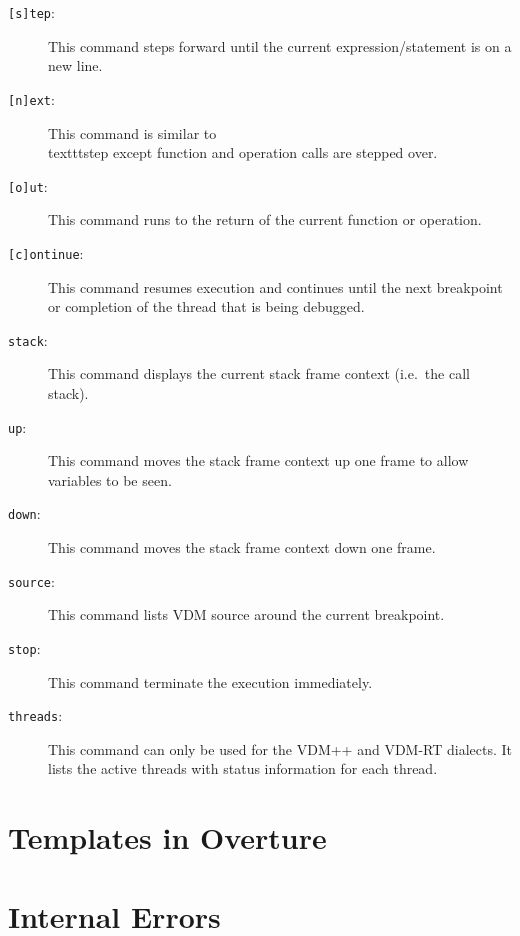 \documentclass{overturerepchap}
\begin{document}
\begin{description}
\item[\texttt{[s]tep}:] This command steps forward until the
  current expression/statement is on a new line. 
\item[\texttt{[n]ext}:] This command is similar to \\texttt{step} except
 function and operation calls are stepped over.  
\item[\texttt{[o]ut}:] This command runs to the return of the current
  function or operation.  
\item[\texttt{[c]ontinue}:] This command resumes execution and continues
  until the next breakpoint or completion of the thread that is being
  debugged. 
\item[\texttt{stack}:] This command displays the current stack frame
  context (i.e.\ the call stack). 
\item[\texttt{up}:] This command moves the stack frame context up one
  frame to allow variables to be seen.  
\item[\texttt{down}:] This command moves the stack frame context down
  one frame.  
\item[\texttt{source}:] This command lists VDM source around the
  current breakpoint.  
\item[\texttt{stop}:] This command terminate the execution
  immediately.  
\item[\texttt{threads}:] This command can only be used for the VDM++
  and VDM-RT dialects. It lists the active threads with status
  information for each thread. 
\end{description}

\appendix
\newpage





\newpage
\chapter{Templates in Overture}\label{app:templates}

\newpage
\chapter{Internal Errors}\label{app:internalerrors}
\end{document}
